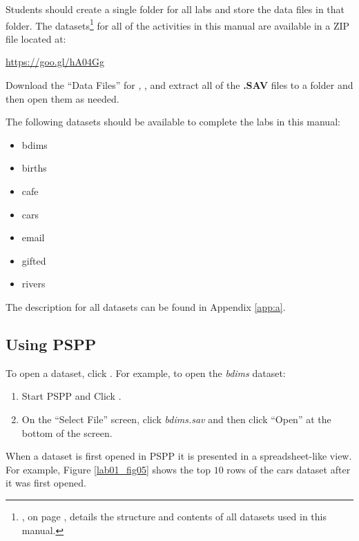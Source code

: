 Students should create a single folder for all labs and store the data files in that folder. The datasets\footnote{, on page \pageref{app:a}, details the structure and contents of all datasets used in this manual.} for all of the activities in this manual are available in a ZIP file located at:

\url{https://goo.gl/hA04Gg}

Download the ``Data Files'' for \myVersion, \myTime, and extract all of the \textbf{.SAV} files to a folder and then open them as needed.

The following datasets should be available to complete the labs in this manual:

\begin{itemize}
  \item bdims
  \item births
  \item cafe
  \item cars
  \item email
  \item gifted
  \item rivers
\end{itemize}

The description for all datasets can be found in Appendix \ref{app:a}.

\subsection{Using PSPP}

To open a dataset, click \textsc{}. For example, to open the \textit{bdims} dataset:

\begin{enumerate}
  \item Start \acs{PSPP} and Click \textsc{}.
  \item On the ``Select File'' screen, click \textit{bdims.sav} and then click ``Open'' at the bottom of the screen.
\end{enumerate}

When a dataset is first opened in \acs{PSPP} it is presented in a spreadsheet-like view. For example, Figure \ref{lab01_fig05} shows the top $ 10 $ rows of the cars dataset after it was first opened.

